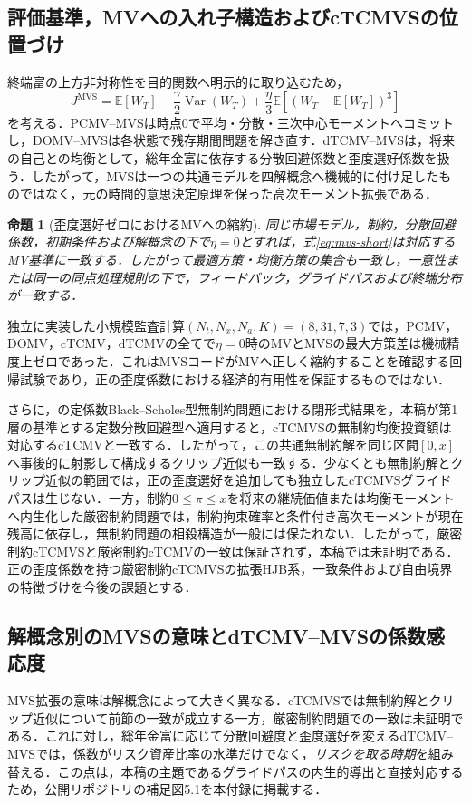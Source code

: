 \documentclass[10pt,a4paper]{article}
\theoremstyle{plain}
\newtheorem{proposition}{命題}
\theoremstyle{definition}
\newcommand{\E}{\mathbb{E}}
\DeclareMathOperator{\Var}{Var}
\begin{document}
\subsection{評価基準，MVへの入れ子構造およびcTCMVSの位置づけ}
終端富の上方非対称性を目的関数へ明示的に取り込むため，
\begin{equation}
J^{\mathrm{MVS}}=\E[W_T]-\frac{\gamma}{2}\Var(W_T)
+\frac{\eta}{3}\E[(W_T-\E[W_T])^3]
\label{eq:mvs-short}
\end{equation}
を考える．PCMV--MVSは時点0で平均・分散・三次中心モーメントへコミットし，DOMV--MVSは各状態で残存期間問題を解き直す．dTCMV--MVSは，将来の自己との均衡として，総年金富に依存する分散回避係数と歪度選好係数を扱う．したがって，MVSは一つの共通モデルを四解概念へ機械的に付け足したものではなく，元の時間的意思決定原理を保った高次モーメント拡張である．

\begin{proposition}[歪度選好ゼロにおけるMVへの縮約]
同じ市場モデル，制約，分散回避係数，初期条件および解概念の下で$\eta=0$とすれば，式\eqref{eq:mvs-short}は対応するMV基準に一致する．したがって最適方策・均衡方策の集合も一致し，一意性または同一の同点処理規則の下で，フィードバック，グライドパスおよび終端分布が一致する．
\end{proposition}

独立に実装した小規模監査計算$(N_t,N_x,N_a,K)=(8,31,7,3)$では，PCMV，DOMV，cTCMV，dTCMVの全てで$\eta=0$時のMVとMVSの最大方策差は機械精度上ゼロであった．これはMVSコードがMVへ正しく縮約することを確認する回帰試験であり，正の歪度係数における経済的有用性を保証するものではない．

さらに，\citet{MuTianYang2019}の定係数Black--Scholes型無制約問題における閉形式結果を，本稿が第1層の基準とする定数分散回避型へ適用すると，cTCMVSの無制約均衡投資額は対応するcTCMVと一致する．したがって，この共通無制約解を同じ区間$[0,x]$へ事後的に射影して構成するクリップ近似も一致する．少なくとも無制約解とクリップ近似の範囲では，正の歪度選好を追加しても独立したcTCMVSグライドパスは生じない．一方，制約$0\leq\pi\leq x$を将来の継続価値または均衡モーメントへ内生化した厳密制約問題では，制約拘束確率と条件付き高次モーメントが現在残高に依存し，無制約問題の相殺構造が一般には保たれない．したがって，厳密制約cTCMVSと厳密制約cTCMVの一致は保証されず，本稿では未証明である．正の歪度係数を持つ厳密制約cTCMVSの拡張HJB系，一致条件および自由境界の特徴づけを今後の課題とする．

\subsection{解概念別のMVSの意味とdTCMV--MVSの係数感応度}
\label{sec:mvs-exploratory}
MVS拡張の意味は解概念によって大きく異なる．cTCMVSでは無制約解とクリップ近似について前節の一致が成立する一方，厳密制約問題での一致は未証明である．これに対し，総年金富に応じて分散回避度と歪度選好を変えるdTCMV--MVSでは，係数がリスク資産比率の水準だけでなく，\emph{リスクを取る時期}を組み替える．この点は，本稿の主題であるグライドパスの内生的導出と直接対応するため，公開リポジトリの補足図5.1を本付録に掲載する．
\end{document}
